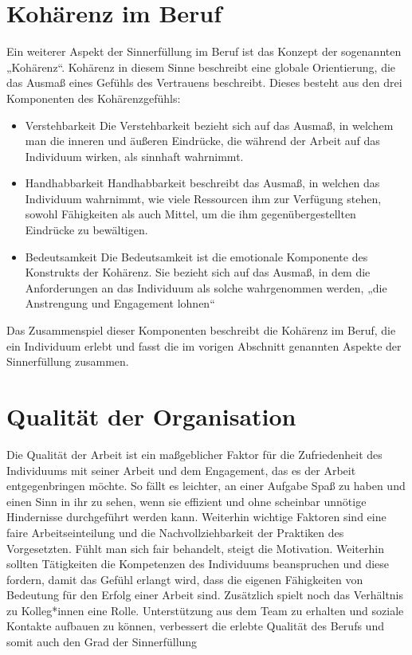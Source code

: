 \section{Kohärenz im Beruf}
Ein weiterer Aspekt der Sinnerfüllung im Beruf ist das Konzept der sogenannten „Kohärenz“. Kohärenz in diesem Sinne beschreibt eine globale Orientierung, die das Ausmaß eines Gefühls des Vertrauens beschreibt. Dieses besteht aus den drei Komponenten des Kohärenzgefühls:
\begin{itemize}
    \item Verstehbarkeit\newline
    Die Verstehbarkeit bezieht sich auf das Ausmaß, in welchem man die inneren und äußeren Eindrücke, die während der Arbeit auf das Individuum wirken, als sinnhaft wahrnimmt.
    \item Handhabbarkeit\newline
    Handhabbarkeit beschreibt das Ausmaß, in welchen das Individuum wahrnimmt, wie viele Ressourcen ihm zur Verfügung stehen, sowohl Fähigkeiten als auch Mittel, um die ihm gegenübergestellten Eindrücke zu bewältigen.
    \item Bedeutsamkeit\newline
    Die Bedeutsamkeit ist die emotionale Komponente des Konstrukts der Kohärenz. Sie bezieht sich auf das Ausmaß, in dem die Anforderungen an das Individuum als solche wahrgenommen werden, „die Anstrengung und Engagement lohnen“
\end{itemize}
\cite[S.201]{FluterHoffmann.2018}\newline
Das Zusammenspiel dieser Komponenten beschreibt die Kohärenz im Beruf, die ein Individuum erlebt und fasst die im vorigen Abschnitt genannten Aspekte der Sinnerfüllung zusammen. 
\section{Qualität der Organisation}
Die Qualität der Arbeit ist ein maßgeblicher Faktor für die Zufriedenheit des Individuums mit seiner Arbeit und dem Engagement, das es der Arbeit entgegenbringen möchte. So fällt es leichter, an einer Aufgabe Spaß zu haben und einen Sinn in ihr zu sehen, wenn sie effizient und ohne scheinbar unnötige Hindernisse durchgeführt werden kann. Weiterhin wichtige Faktoren sind eine faire Arbeitseinteilung und die Nachvollziehbarkeit der Praktiken des Vorgesetzten. Fühlt man sich fair behandelt, steigt die Motivation. Weiterhin sollten Tätigkeiten die Kompetenzen des Individuums beanspruchen und diese fordern, damit das Gefühl erlangt wird, dass die eigenen Fähigkeiten von Bedeutung für den Erfolg einer Arbeit sind. Zusätzlich spielt noch das Verhältnis zu Kolleg*innen eine Rolle. Unterstützung aus dem Team zu erhalten und soziale Kontakte aufbauen zu können, verbessert die erlebte Qualität des Berufs und somit auch den Grad der Sinnerfüllung \cite[S.194]{Voswinkel.2018}\cite[S.205-206]{FluterHoffmann.2018}
